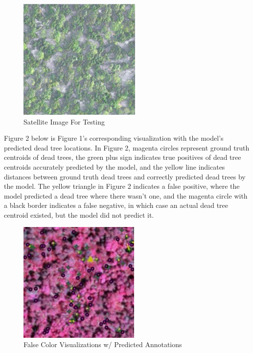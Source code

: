 \documentclass[conference]{ieeetran}
\begin{document}
\begin{figure}[htbp]
  \centering
  \includegraphics[width=0.65\linewidth]{Picture1.png}
  \caption{Satellite Image For Testing}
  \label{fig:my_label}
\end{figure}

 Figure 2 below is Figure 1's corresponding visualization with the model's predicted dead tree locations. In Figure 2, magenta circles represent ground truth centroids of dead trees, the green plus sign indicates true positives of dead tree centroids accurately predicted by the model, and the yellow line indicates distances between ground truth dead trees and correctly predicted dead trees by the model. The yellow triangle in Figure 2 indicates a false positive, where the model predicted a dead tree where there wasn't one, and the magenta circle with a black border indicates a false negative, in which case an actual dead tree centroid existed, but the model did not predict it.

\begin{figure}[htbp]
  \centering
  \includegraphics[width=0.65\linewidth]{Picture2.jpg}
  \caption{False Color Visualizations w/ Predicted Annotations}
  \label{fig:my_label}
\end{figure}
\end{document}
